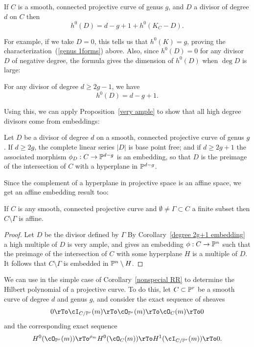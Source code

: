 \begin{theorem}\label{RR}
 If $C$ is a smooth, connected projective curve of genus $g$, and $D$ a divisor of degree $d$ on $C$ then
$$
h^0(D) = d - g + 1 + h^0(K_C - D).
$$
\end{theorem}

For example, if we take $D=0$, this tells us that $h^0(K) = g$, proving the characterization~(\ref{genus 1forms}) above. Also, since $h^0(D) = 0$ for any divisor $D$ of negative degree, the formula gives the dimension of $h^{0}(D)$ when $\deg D$ is large:

\begin{corollary}\label{nonspecial RR}
For any divisor of degree $d \geq 2g-1$, we have
$$
h^0(D) = d - g + 1.
$$
\end{corollary}

Using this, we can apply Proposition~\ref{very ample} to show that all high degree divisors come from embeddings:

\begin{corollary}\label{degree 2g+1 embedding}
Let $D$ be a divisor of degree $d$ on a smooth, connected projective curve of genus $g$. If $d \geq 2g$, the complete linear series $|D|$ is base point free; and if $d \geq 2g+1$ the associated morphism $\phi_D : C \to \PP^{d-g}$ is an embedding, so that
$D$ is the preimage of the intersection of $C$ with a hyperplane in $ \PP^{d-g}$.
\end{corollary}

Since the complement of a hyperplane in projective space is an affine space, we get an affine embedding result too:

\begin{corollary}
 If $C$ is any smooth, connected projective curve and $\emptyset \neq \Gamma \subset C$ a finite subset then $C \setminus \Gamma$ is affine.
\end{corollary}
\begin{proof}
Let $D$ be the divisor defined by $\Gamma$ By Corollary~\ref{degree 2g+1 embedding} a high multiple of $D$ is very ample,
and gives an embedding $\phi: C\to \PP^n$ such that the preimage of the intersection of $C$ with some hyperplane $H$
is a multiple of $D$. It follows that $C\setminus \Gamma$ is embedded in $\PP^n\setminus H$.
\end{proof}


We can  use \TRR in the simple case of Corollary~\ref{nonspecial RR} to determine the Hilbert polynomial of a projective curve. To do this, let $C \subset \PP^r$ be a smooth curve of degree $d$ and genus $g$, and consider the exact sequence of sheaves
$$
0 \rTo \cI_{C/\PP^r}(m) \rTo \cO_{\PP^r}(m) \rTo \cO_C(m) \rTo 0
$$
and the corresponding exact sequence
$$
 H^0(\cO_{\PP^r}(m)) \rTo^{\rho_m} H^0(\cO_C(m)) \rTo H^1(\cI_{C/\PP^r}(m)) \rTo 0.
$$

